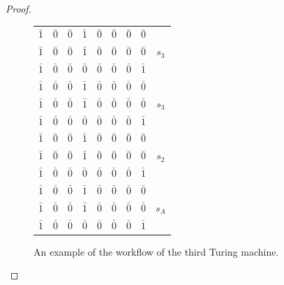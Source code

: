 \documentclass[12pt,a4paper]{scrartcl}
\theoremstyle{plain}
\theoremstyle{definition}
\newcommand{\2}{\mathbb{Z} / 2 \mathbb{Z}}
\newcommand{\1}{\bar{1}}
\newcommand{\0}{\bar{0}}
\begin{document}
\begin{proof}
\begin{figure}[]
\begin{minipage}[c]{0.5\textwidth}
\begin{tabular}{|c|c|c|c|c|c|c|c||c|}
			$\1$  & $\0$ & $\0$\cellcolor[gray]{0.7} & $\1$ & $\0$ & $\0$ & $\0$ & $\0$ &  \\
			$\1$  & $\0$ \cellcolor[gray]{0.7}& $\0$ & $\1$ & $\0$ & $\0$ & $\0$ & $\0$ & $s_3$ \\
			$\1$  & $\0$ & $\0$ & $\0$ & $\0$ & $\0$\cellcolor[gray]{0.7} & $\0$ & $\1$ & \\ \hline
			
			$\1$  & $\0$ & $\0$ & $\1$ \cellcolor[gray]{0.7}& $\0$ & $\0$ & $\0$ & $\0$ &  \\
			$\1$  & $\0$ \cellcolor[gray]{0.7}& $\0$ & $\1$ & $\0$ & $\0$ & $\0$ & $\0$ & $s_3$ \\
			$\1$  & $\0$ & $\0$ & $\0$ & $\0$ & $\0$ & $\0$\cellcolor[gray]{0.7} & $\1$ & \\ \hline
			
			$\1$  & $\0$ & $\0$\cellcolor[gray]{0.7} & $\1$& $\0$ & $\0$ & $\0$ & $\0$ &  \\
			$\1$ \cellcolor[gray]{0.7}& $\0$ & $\0$ & $\1$ & $\0$ & $\0$ & $\0$ & $\0$ & $s_2$ \\
			$\1$  & $\0$ & $\0$ & $\0$ & $\0$ & $\0$ & $\0$ & $\1$\cellcolor[gray]{0.7} & \\ \hline
			
			$\1$  & $\0$ & $\0$\cellcolor[gray]{0.7} & $\1$& $\0$ & $\0$ & $\0$ & $\0$ &  \\
			$\1$ \cellcolor[gray]{0.7}& $\0$ & $\0$ & $\1$ & $\0$ & $\0$ & $\0$ & $\0$ & $s_A$ \\
			$\1$  & $\0$ & $\0$ & $\0$ & $\0$ & $\0$ & $\0$ & $\1$\cellcolor[gray]{0.7} & \\ \hline
		\end{tabular}
		\end{minipage}
		\caption{An example of the workflow of the third Turing machine.}
		\label{Beispiel_dritte_TM}
	\end{figure}


\end{proof}
\end{document}
